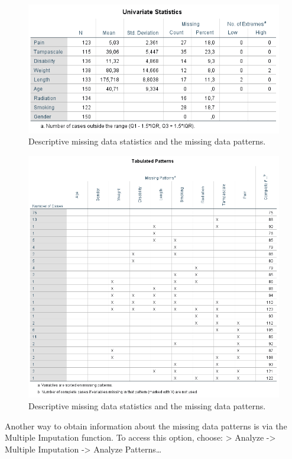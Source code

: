 \documentclass[]{book}
\begin{document}
\begin{figure}

{\centering \includegraphics[width=0.9\linewidth]{images/tab2.1a} 

}

\caption{Descriptive missing data statistics and the missing data patterns.}\label{fig:tab2-1}
\end{figure}\begin{figure}

{\centering \includegraphics[width=0.9\linewidth]{images/tab2.1b} 

}

\caption{Descriptive missing data statistics and the missing data patterns.}\label{fig:tab2-1}
\end{figure}

Another way to obtain information about the missing data patterns is via
the Multiple Imputation function. To access this option, choose:
\textgreater{} Analyze -\textgreater{} Multiple Imputation
-\textgreater{} Analyze Patterns\ldots{}
\end{document}
